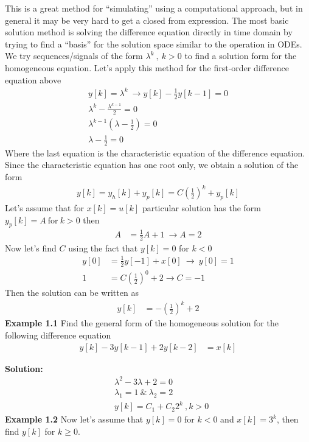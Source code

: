 \documentclass[twoside]{article}
\begin{document}
%
This is a great method for ``simulating'' using a computational
approach, but in general it may be very hard to get a closed 
from expression.
%
The most basic solution method is solving the difference equation
directly in time domain by trying to find a ``basis'' for the solution
space similar to the operation in ODEs. We try sequences/signals
of the form $\lambda^k \ , \ k >0$ to find a solution form for the
homogeneous equation. Let's apply this method for the first-order
difference equation above
%
\begin{align*}
y[k] = \lambda^k \ \rightarrow y[k] - \frac{1}{2} y[k-1] = 0 \\
\lambda^k - \frac{\lambda^{k-1}}{2} = 0 \\
\lambda^{k-1} \left( \lambda - \frac{1}{2}  \right) = 0 \\
\lambda - \frac{1}{2} = 0
\end{align*}
%
Where the last equation is the characteristic equation of the difference
equation. Since the characteristic equation has one root only, we
obtain a solution of the form
%
\begin{align*}
y[k] = y_h[k] + y_p[k] = C \left( \frac{1}{2} \right)^k + y_p[k]
\end{align*}
%
Let's assume that for $x[k] = u[k]$ particular solution has the 
form $y_p[k] = A \ \mathrm{for} \ k > 0$ then
%
\begin{align*}
A &= \frac{1}{2} A + 1 \ \rightarrow A = 2
\end{align*}
%
Now let's find $C$ using the fact that $y[k] = 0$ for $k<0$
%
\begin{align*}
y[0] &= \frac{1}{2} y[-1] + x[0] \ \rightarrow \  y[0] = 1
\\
1 &= C \left( \frac{1}{2} \right)^0 + 2 \rightarrow  C = -1
\end{align*}
%
Then the solution can be written as
%
\begin{align*}
  y[k] &= -\left( \frac{1}{2} \right)^k + 2
\end{align*}
%
\textbf{Example 1.1} Find the general form of the homogeneous solution
for the following difference equation
%
\begin{align*}
  y[k] - 3 y[k-1] + 2 y[k-2] &= x[k]
\end{align*}

\textbf{Solution:}
%
\begin{align*}
&\lambda^2 - 3 \lambda + 2 = 0
\\
&\lambda_1 = 1 \ \& \ \lambda_2 = 2 
\\
&y[k] = C_1 + C_2 2^k \ , k > 0 
\end{align*}
%
\textbf{Example 1.2} Now let's assume that $y[k] = 0$ for $k<0$
and $x[k] = 3^k$, then find $y[k]$ for $k \geq 0$.
\end{document}
